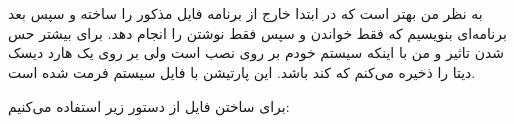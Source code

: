 \section{}
به نظر من بهتر است که در ابتدا خارج از برنامه فایل مذکور را ساخته و سپس بعد برنامه‌ای بنویسیم که فقط خواندن و سپس
فقط نوشتن را انجام دهد. برای بیشتر حس شدن تاثیر
 و 
من با اینکه سیستم خودم بر روی
نصب است ولی بر روی یک هارد دیسک دیتا را ذخیره می‌کنم که کند باشد. این پارتیشن با فایل سیستم
فرمت شده است.

برای ساختن فایل از دستور زیر استفاده می‌کنیم:



